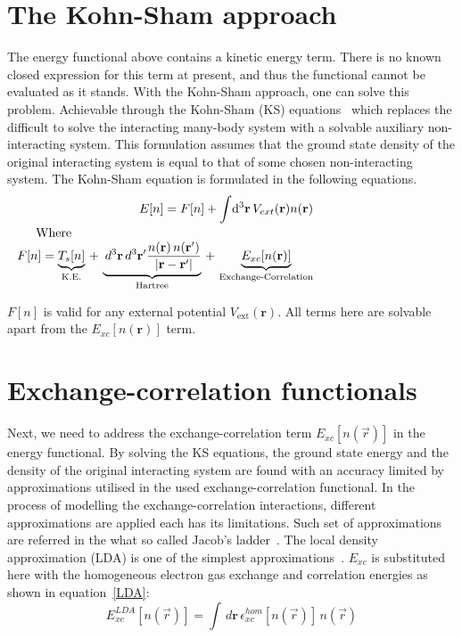 \section{The Kohn-Sham approach}
\label{KS}
The energy functional above contains a kinetic energy term. There is no known closed expression for this term at present, and thus the functional cannot be evaluated as it stands. With the Kohn-Sham approach, one can solve this problem. Achievable through the Kohn-Sham (KS) equations~\cite{Kohn1965} which replaces the difficult to solve the interacting many-body system with a solvable auxiliary non-interacting system. This formulation assumes that the ground state density of the original interacting system is equal to that of some chosen non-interacting system. The Kohn-Sham equation is formulated in the following equations.
\begin{eqnarray}
E[n]=F[n]+\int \!  \mathrm{d^3} {\textbf{r}}\, V_{ext}(\textbf{r})n(\textbf{r}) \\
\noalign {{Where}} 
F[n]=\underbrace{T_s[n]}_\textrm{K.E.} \, + \, \underbrace{ \, d^3\textbf{r}\,d^3\textbf{r}' \frac{n( \textbf{r} )\,n( \textbf{r}' )}{\abs{\textbf{r}-\textbf{r}'}}}_\textrm{Hartree} \, + \, \underbrace{ E_{xc}[n(\vec{r})]}_\textrm{Exchange-Correlation}
\end{eqnarray}

$F[n]$ is valid for any external potential $V_{\text{ext}}(\textbf{r})$. All terms here are solvable apart from the $E_{xc}[n(\textbf{r})]$ term.
\section{Exchange-correlation functionals}
\label{XC}
Next, we need to address the exchange-correlation term $E_{xc}[n(\vec{r})]$ in the energy functional. By solving the KS equations, the ground state energy and the density of the original interacting system are found with an accuracy limited by approximations utilised in the used exchange-correlation functional. In the process of modelling the exchange-correlation interactions, different approximations are applied each has its limitations. Such set of approximations are referred in the what so called Jacob's ladder~\cite{Perdew2001, Perdew2005}. The local density approximation (LDA) is one of the simplest approximations~\cite{Kohn1965, Barth1972}. $E_{xc}$ is substituted here with the homogeneous electron gas exchange and correlation energies as shown in equation~\ref{LDA}:
\begin{equation}
E_{xc}^{LDA}[n(\vec{r})] = \int \!   \, d\textbf{r} \, \epsilon_{xc}^{hom}[n(\vec{r})] \, n(\vec{r}) 
\label{LDA}
\end{equation}

